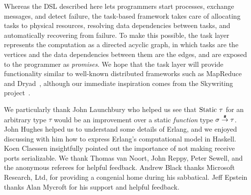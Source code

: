 \documentclass{sigplanconf}
\begin{document}
Whereas the DSL described here lets programmers start processes, exchange messages, and detect failure, the task-based framework takes care of allocating tasks to physical resources, resolving data dependencies between tasks, and automatically recovering from failure. 
To make this possible, the task layer represents the computation as a directed acyclic graph, in which tasks are the vertices and the data dependencies between them are the edges, and are exposed to the programmer as \emph{promises}.
We hope that the task layer will provide functionality similar to well-known distributed frameworks such as MapReduce~\cite{MapReduce2008} and Dryad~\cite{Dryad2007}, although our immediate inspiration comes from the Skywriting project~\cite{Murray2010,Murray2011}.

\acks
We particularly thank John Launchbury who helped us see that $\textt{Static}\;\tau$ for an arbitrary type $\tau$
would be an improvement over a static \emph{function} type 
$\sigma \stackrel{\texttt{\#}}{\rightarrow} \tau$.  John Hughes helped us to understand some details of Erlang, and we enjoyed discussing with him how to express Erlang's computational model in Haskell. Koen Claessen
insightfully pointed out the importance of not making receive ports serializable. 
We thank Thomas van Noort, John Reppy, Peter Sewell, and the anonymous referees for helpful feedback.
Andrew Black thanks Microsoft Research, Ltd, for providing a congenial home during his sabbatical.
Jeff Epstein thanks Alan Mycroft for his support and helpful feedback. 





%
%
%
\end{document}
